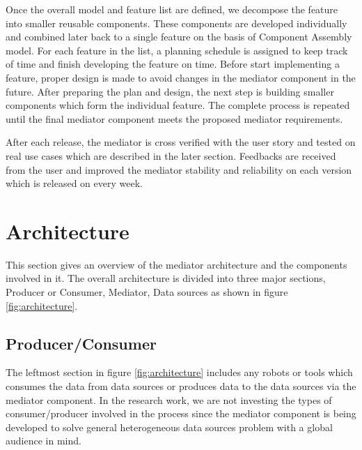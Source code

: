 	
	
	Once the overall model and feature list are defined, we decompose the feature into smaller reusable components. These components are developed individually and combined later back to a single feature on the basis of Component Assembly model. For each feature in the list, a planning schedule is assigned to keep track of time and finish developing the feature on time. Before start implementing a feature, proper design is made to avoid changes in the mediator component in the future. After preparing the plan and design, the next step is building smaller components which form the individual feature. The complete process is repeated until the final mediator component meets the proposed mediator requirements. 
	
	After each release, the mediator is cross verified with the user story and tested on real use cases which are described in the later section. Feedbacks are received from the user and improved the mediator stability and reliability on each version which is released on every week.
	
	
	\section{Architecture} \label{sec:architecture}
	This section gives an overview of the mediator architecture and the components involved in it.
	The overall architecture is divided into three major sections, Producer or Consumer, Mediator, Data sources as shown in figure \ref{fig:architecture}.
	

	\subsection{Producer/Consumer}
	
	The leftmost section in figure \ref{fig:architecture} includes any robots or tools which consumes the data from data sources or produces data to the data sources via the mediator component. In the research work, we are not investing the types of consumer/producer involved in the process since the mediator component is being developed to solve general heterogeneous data sources problem with a global audience in mind.
	
	\newpage
	
